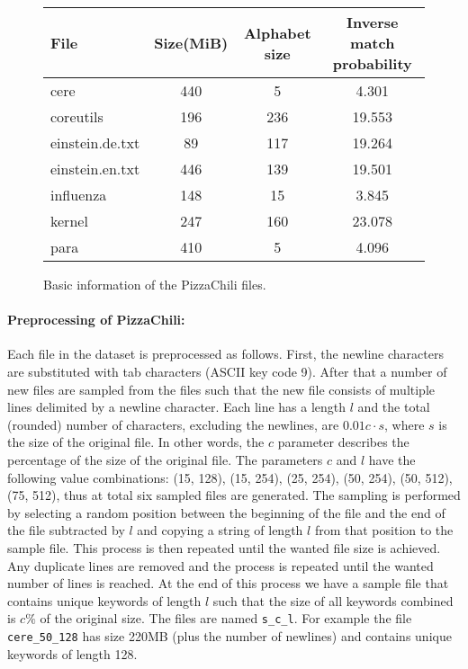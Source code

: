\documentclass[english,twoside,censored,csm,algorithms-track-2020]{HYthesisML}
\theoremstyle{plain}
\theoremstyle{definition}
\begin{document}
\begin{figure}
\begin{center}
  \begin{tabular}{|l|c|c|c|}
    \hline
    \textbf{File} & \textbf{Size(MiB)} & \textbf{Alphabet size} & \textbf{Inverse match probability} \\
    \hline
    cere & 440 & 5 & 4.301 \\
    coreutils & 196 & 236 & 19.553 \\
    einstein.de.txt & 89 & 117 & 19.264 \\
    einstein.en.txt & 446 & 139 & 19.501 \\
    influenza & 148 & 15 & 3.845 \\
    kernel & 247 & 160 & 23.078 \\
    para & 410 & 5 & 4.096\\
    \hline
  \end{tabular}
  \caption{Basic information of the PizzaChili files. \citep{PizzaChili}}
  \label{tbl-pizzachili-info}
\end{center}
\end{figure}


\paragraph{Preprocessing of PizzaChili:}
Each file in the dataset is preprocessed as follows. First, the newline characters are substituted
with tab characters (ASCII key code 9). After that a number of new files are sampled from the files
such that the new file consists of multiple lines delimited by a newline character. Each line has a
length $l$ and the total (rounded) number of characters, excluding the newlines, are $0.01c\cdot s$,
where $s$ is the size of the original file. In other words, the $c$ parameter describes the percentage
of the size of the original file. The parameters $c$ and $l$ have the following value
combinations: (15, 128), (15, 254), (25, 254), (50, 254), (50, 512), (75, 512), thus at total six
sampled files are generated. The sampling is performed by selecting a random position between
the beginning of the file and the end of the file subtracted by $l$ and copying a string of length
$l$ from that position to the sample file. This process is then repeated until the wanted file size is
achieved. Any duplicate lines are removed and the process is repeated until the wanted
number of lines is reached. At the end of this process we have a sample file that contains unique keywords of length
$l$ such that the size of all keywords combined is $c\%$ of the original size. The files are
named \texttt{s\_c\_l}. For example the file \texttt{cere\_50\_128} has size 220MB
(plus the number of newlines) and contains unique keywords of length 128.
\end{document}
